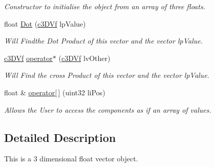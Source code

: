 \begin{DoxyCompactItemize}
\begin{DoxyCompactList}\small\item\em Constructor to initialise the object from an array of three floats. \end{DoxyCompactList}\item 
\hypertarget{classc3_d_vf_ab129f2b7d7e584a81a8154c79d58ff04}{
float \hyperlink{classc3_d_vf_ab129f2b7d7e584a81a8154c79d58ff04}{Dot} (\hyperlink{classc3_d_vf}{c3DVf} lpValue)}
\label{classc3_d_vf_ab129f2b7d7e584a81a8154c79d58ff04}

\begin{DoxyCompactList}\small\item\em Will Findthe Dot Product of this vector and the vector lpValue. \end{DoxyCompactList}\item 
\hypertarget{classc3_d_vf_a9dee0b630549ea6e972b0a2e308fdbc8}{
\hyperlink{classc3_d_vf}{c3DVf} \hyperlink{classc3_d_vf_a9dee0b630549ea6e972b0a2e308fdbc8}{operator$\ast$} (\hyperlink{classc3_d_vf}{c3DVf} lvOther)}
\label{classc3_d_vf_a9dee0b630549ea6e972b0a2e308fdbc8}

\begin{DoxyCompactList}\small\item\em Will Find the cross Product of this vector and the vector lpValue. \end{DoxyCompactList}\item 
\hypertarget{classc3_d_vf_a9c73399eb28acfbe9a132c679249aea0}{
float \& \hyperlink{classc3_d_vf_a9c73399eb28acfbe9a132c679249aea0}{operator\mbox{[}$\,$\mbox{]}} (uint32 liPos)}
\label{classc3_d_vf_a9c73399eb28acfbe9a132c679249aea0}

\begin{DoxyCompactList}\small\item\em Allows the User to access the components as if an array of values. \end{DoxyCompactList}\end{DoxyCompactItemize}


\subsection{Detailed Description}
This is a 3 dimensional float vector object. 